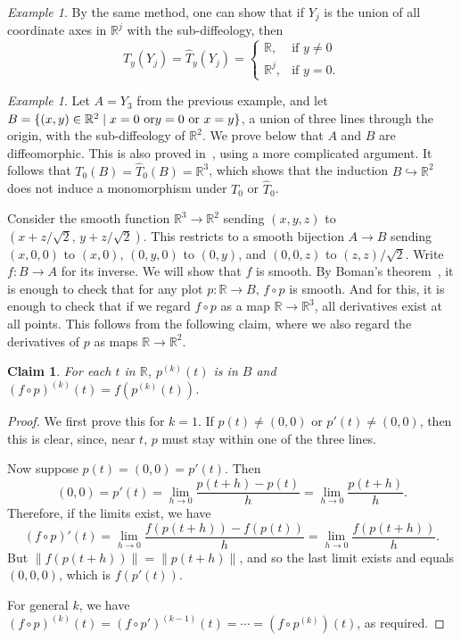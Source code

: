 \documentclass{amsart}
\newtheorem*{claim*}{Claim}
\theoremstyle{remark}
\newtheorem{ex}[de]{Example}
\def \R{\mathbb{R}}
\begin{document}
\begin{ex}
By the same method, one can show that if $Y_j$ is the union of all coordinate axes in $\R^j$ with the sub-diffeology, then
\[
T_y(Y_j)=\hat{T}_y(Y_j)=\begin{cases} \R, & \textrm{if $y \neq 0$}\\ \R^j, & \textrm{if $y=0$}. \end{cases}
\]
\end{ex}

\begin{ex}\label{ex:axes-in-R3}
Let $A = Y_3$ from the previous example, and
let $B = \{ (x,y) \in \R^2 \mid x = 0 \text{ or}\break y = 0 \text{ or } x = y \}$,
a union of three lines through the origin, with the sub-diffeology of $\R^2$.
We prove below that $A$ and $B$ are diffeomorphic.
This is also proved in~\cite[Example~2.72]{Wa}, using a more complicated argument.
It follows that $T_0(B) = \hat{T}_0(B) = \R^3$,
which shows that the induction $B \hookrightarrow \R^2$ does not induce a
monomorphism under $T_0$ or $\hat{T}_0$.

Consider the smooth function $\R^3 \to \R^2$ sending $(x,y,z)$ to
$(x+z/\sqrt{2},\, y+z/\sqrt{2})$.
This restricts to a smooth bijection $A \to B$ sending
$(x, 0, 0)$ to $(x, 0)$, $(0, y, 0)$ to $(0, y)$, and
$(0, 0, z)$ to $(z, z)/\sqrt{2}$.
Write $f : B \to A$ for its inverse.  We will show that $f$ is smooth.
By Boman's theorem~\cite[Corollary~3.14]{KM},
it is enough to check that for any plot $p : \R \to B$, $f \circ p$ is smooth.
And for this, it is enough to check that if we regard $f \circ p$ as a map
$\R \to \R^3$, all derivatives exist at all points.
This follows from the following claim, where we also regard
the derivatives of $p$ as maps $\R \to \R^2$.
\end{ex}

\begin{claim*}
For each $t$ in $\R$, $p^{(k)}(t)$ is in $B$ and $(f \circ p)^{(k)}(t) = f(p^{(k)}(t))$.
\end{claim*}

\begin{proof}
We first prove this for $k = 1$.
If $p(t) \neq (0,0)$ or $p'(t) \neq (0,0)$, then this is clear,
since, near $t$, $p$ must stay within one of the three lines.
%

Now suppose $p(t) = (0,0) = p'(t)$.  Then
\[
  (0,0) = p'(t) = \lim_{h \to 0} \frac{p(t+h)-p(t)}{h} = \lim_{h \to 0} \frac{p(t+h)}{h} .
\]
Therefore, if the limits exist, we have
\[
  (f \circ p)'(t) = \lim_{h \to 0} \frac{f(p(t+h)) - f(p(t))}{h} = \lim_{h \to 0} \frac{f(p(t+h))}{h} .
\]
But $\|f(p(t+h))\| = \|p(t+h)\|$, %
and so the last limit exists and equals $(0,0,0)$, which is $f(p'(t))$.

For general $k$, we have
$(f \circ p)^{(k)}(t) = (f \circ p')^{(k-1)}(t) = \cdots = (f \circ p^{(k)})(t)$, as required.
\end{proof}
\end{document}
